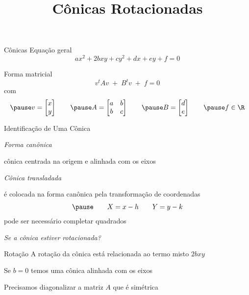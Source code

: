\documentclass[fleqn,aspectratio=169,12pt]{beamer}
\title{Cônicas Rotacionadas}
\begin{document}
\addtitle

\begin{frame}{Cônicas}
  Equação geral
  \[
    ax^2 + 2bxy + cy^2 + dx + ey + f = 0
  \]

  \pause
  Forma matricial
  \[
    v^tAv \;+\; B^tv \;+\; f = 0
  \]
  \pause
  com
  \[
    \pause
    v = \begin{bmatrix} x \\ y \end{bmatrix}
    \qquad
    \pause
    A = \begin{bmatrix}
      a & b \\
      b & c
    \end{bmatrix}
    \qquad
    \pause
    B = \begin{bmatrix} d \\ e \end{bmatrix}
    \qquad
    \pause
    f \in \R
  \]
\end{frame}

\begin{frame}{Identificação de Uma Cônica}

  \emph{Forma canônica}

  \pause
  \qquad cônica centrada na origem e alinhada com os eixos

  \pause
  \bigskip
  \emph{Cônica transladada}

  \pause
  \qquad é colocada na forma canônica pela transformação de coordenadas
  \[
    \pause
    \qquad
    X = x - h
    \qquad
    Y = y - k
  \]
  \pause
  \qquad pode ser necessário completar quadrados

  \pause
  \bigskip
  \emph{Se a cônica estiver rotacionada?}
\end{frame}


\begin{frame}{Rotação}
  A rotação da cônica está relacionada ao termo misto \(2bxy\)

  \pause
  \bigskip
  Se \(b=0\) temos uma cônica alinhada com os eixos

  \pause
  \bigskip
  Precisamos diagonalizar a matriz $A$ que é simétrica
\end{frame}
\end{document}
